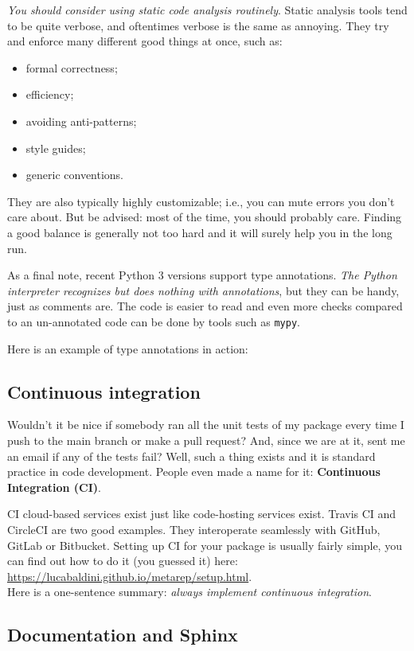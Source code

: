 \textit{You should consider using static code analysis routinely}. Static analysis tools tend to be quite verbose, and oftentimes verbose is the same as annoying. They try and enforce many different good things at once, such as:
\begin{itemize}
    \item[-] formal correctness;
    \item[-] efficiency;
    \item[-] avoiding anti-patterns;
    \item[-] style guides;
    \item[-] generic conventions.
\end{itemize}
They are also typically highly customizable; i.e., you can mute errors you don't care about. But be advised: most of the time, you should probably care. Finding a good balance is generally not too hard and it will surely help you in the long run.

As a final note, recent Python 3 versions support type annotations. \textit{The Python interpreter recognizes but does nothing with annotations}, but they can be handy, just as comments are. The code is easier to read and even more checks compared to an un-annotated code can be done by tools such as \texttt{mypy}.

Here is an example of type annotations in action:



\subsection{Continuous integration}
Wouldn't it be nice if somebody ran all the unit tests of my package every time I push to the main branch or make a pull request? And, since we are at it, sent me an email if any of the tests fail? Well, such a thing exists and it is standard practice in code development. People even made a name for it: \textbf{Continuous Integration (CI)}.

CI cloud-based services exist just like code-hosting services exist. Travis CI and CircleCI are two good examples. They interoperate seamlessly with GitHub, GitLab or Bitbucket. Setting up CI for your package is usually fairly simple, you can find out how to do it (you guessed it) here: \url{https://lucabaldini.github.io/metarep/setup.html}. \\ Here is a one-sentence summary: \textit{always implement continuous integration}.

\subsection{Documentation and Sphinx}

